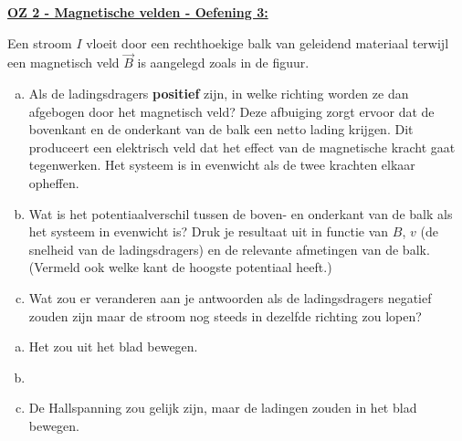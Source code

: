 \textbf{\underline{OZ 2 - Magnetische velden - Oefening 3:}}
\vspace{0.5cm}

Een stroom $I$ vloeit door een rechthoekige balk van geleidend materiaal terwijl een magnetisch veld $\Vec{B}$ is aangelegd zoals in de figuur. 

\begin{enumerate}[(a)]
    \item Als de ladingsdragers \textbf{positief} zijn, in welke richting worden ze dan afgebogen door het magnetisch veld? Deze afbuiging zorgt ervoor dat de bovenkant en de onderkant van de balk een netto lading krijgen. Dit produceert een elektrisch veld dat het effect van de magnetische kracht gaat tegenwerken. Het systeem is in evenwicht als de twee krachten elkaar opheffen.
    \item Wat is het potentiaalverschil tussen de boven- en onderkant van de balk als het systeem in evenwicht is? Druk je resultaat uit in functie van $B$, $v$ (de snelheid van de ladingsdragers) en de relevante afmetingen van de balk. (Vermeld ook welke kant de hoogste potentiaal heeft.)
    \item Wat zou er veranderen aan je antwoorden als de ladingsdragers negatief zouden zijn maar de stroom nog steeds in dezelfde richting zou lopen?
\end{enumerate}

\begin{enumerate}[(a)]
    \item Het zou uit het blad bewegen.
    \item 
    \item De Hallspanning zou gelijk zijn, maar de ladingen zouden in het blad bewegen.
\end{enumerate}

\vspace{1cm}